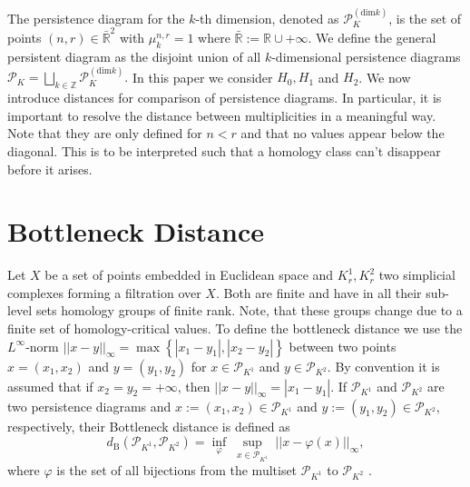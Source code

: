 \documentclass[runningheads]{llncs}
\begin{document}
The persistence diagram for the $k$-th dimension, denoted as $\mathcal{P}^{(\text{dim} k)}_{K}$, is the set of points $(n,r) \in \mathbb{\bar{R}}^2$ with $\mu^{n,r}_k = 1$ where $\bar{\mathbb{R}} := \mathbb{R} \cup +\infty$. We define the general persistent diagram as the disjoint union of all $k$-dimensional persistence diagrams $\mathcal{P}_K = \bigsqcup_{k \in \mathbb{Z}} \mathcal{P}^{(\text{dim} k)}_{K}.$ In this paper we consider $H_0, H_1$ and $H_2$. We now introduce distances for comparison of persistence diagrams. In particular, it is important to resolve the distance between multiplicities in a meaningful way. Note that they are only defined for $n < r$ and that no values appear below the diagonal. This is to be interpreted such that a homology class can't disappear before it arises.

\section{Bottleneck Distance}
Let $X$ be a set of points embedded in Euclidean space and $K_{r}^1, K_{r}^2$ two simplicial complexes forming a filtration over $X$. Both are finite and have in all their sub-level sets homology groups of finite rank. Note, that these groups change due to a finite set of homology-critical values. To define the bottleneck distance we use the $L^\infty$-norm $||x-y||_\infty = \max\left\{|x_1-y_1|,|x_2-y_2|\right\}$ between two points $x = (x_1,x_2)$ and $y = (y_1,y_2)$ for $x \in \mathcal{P}_{K^1}$ and $y \in \mathcal{P}_{K^2}$. By convention it is assumed that if $x_2=y_2=+\infty$, then $||x-y||_\infty = |x_1-y_1|$. If $\mathcal{P}_{K^1}$ and $\mathcal{P}_{K^2}$ are two persistence diagrams and $x:=(x_1,x_2) \in \mathcal{P}_{K^1}$ and $y := (y_1,y_2)\in \mathcal{P}_{K^2}$, respectively, their Bottleneck distance is defined as
\begin{equation}
d_\text{B}(\mathcal{P}_{K^1},\mathcal{P}_{K^2})=\inf_{\varphi} \; \sup_{x\in \mathcal{P}_{K^1}}\;||x-\varphi(x)||_\infty,
\end{equation}
where $\varphi$ is the set of all bijections from the multiset $\mathcal{P}_{K^1}$ to $\mathcal{P}_{K^2}$ \cite{boissonnat2018geometric}.
\end{document}
